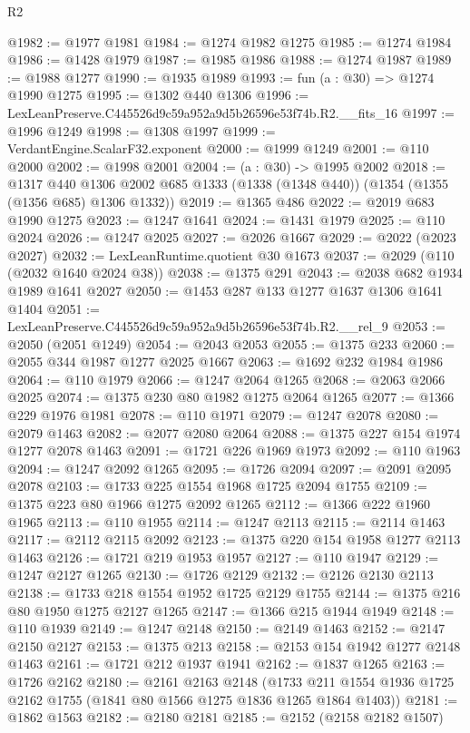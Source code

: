 \begin{lexlean}{R2}
\begin{coremodule}
@1982 := @1977 @1981
@1984 := @1274 @1982 @1275
@1985 := @1274 @1984
@1986 := @1428 @1979
@1987 := @1985 @1986
@1988 := @1274 @1987
@1989 := @1988 @1277
@1990 := @1935 @1989
@1993 := fun (a : @30) => @1274 @1990 @1275
@1995 := @1302 @440 @1306
@1996 := LexLeanPreserve.C445526d9c59a952a9d5b26596e53f74b.R2.__fits_16
@1997 := @1996 @1249
@1998 := @1308 @1997
@1999 := VerdantEngine.ScalarF32.exponent
@2000 := @1999 @1249
@2001 := @110 @2000
@2002 := @1998 @2001
@2004 := (a : @30) -> @1995 @2002
@2018 := @1317
    @440
    @1306
    @2002
    @685
    @1333
    (@1338 (@1348 @440))
    (@1354 (@1355 (@1356 @685) @1306 @1332))
@2019 := @1365 @486
@2022 := @2019 @683 @1990 @1275
@2023 := @1247 @1641
@2024 := @1431 @1979
@2025 := @110 @2024
@2026 := @1247 @2025
@2027 := @2026 @1667
@2029 := @2022 (@2023 @2027)
@2032 := LexLeanRuntime.quotient @30 @1673
@2037 := @2029 (@110 (@2032 @1640 @2024 @38))
@2038 := @1375 @291
@2043 := @2038 @682 @1934 @1989 @1641 @2027
@2050 := @1453 @287 @133 @1277 @1637 @1306 @1641 @1404
@2051 := LexLeanPreserve.C445526d9c59a952a9d5b26596e53f74b.R2.__rel_9
@2053 := @2050 (@2051 @1249)
@2054 := @2043 @2053
@2055 := @1375 @233
@2060 := @2055 @344 @1987 @1277 @2025 @1667
@2063 := @1692 @232 @1984 @1986
@2064 := @110 @1979
@2066 := @1247 @2064 @1265
@2068 := @2063 @2066 @2025
@2074 := @1375 @230 @80 @1982 @1275 @2064 @1265
@2077 := @1366 @229 @1976 @1981
@2078 := @110 @1971
@2079 := @1247 @2078
@2080 := @2079 @1463
@2082 := @2077 @2080 @2064
@2088 := @1375 @227 @154 @1974 @1277 @2078 @1463
@2091 := @1721 @226 @1969 @1973
@2092 := @110 @1963
@2094 := @1247 @2092 @1265
@2095 := @1726 @2094
@2097 := @2091 @2095 @2078
@2103 := @1733 @225 @1554 @1968 @1725 @2094 @1755
@2109 := @1375 @223 @80 @1966 @1275 @2092 @1265
@2112 := @1366 @222 @1960 @1965
@2113 := @110 @1955
@2114 := @1247 @2113
@2115 := @2114 @1463
@2117 := @2112 @2115 @2092
@2123 := @1375 @220 @154 @1958 @1277 @2113 @1463
@2126 := @1721 @219 @1953 @1957
@2127 := @110 @1947
@2129 := @1247 @2127 @1265
@2130 := @1726 @2129
@2132 := @2126 @2130 @2113
@2138 := @1733 @218 @1554 @1952 @1725 @2129 @1755
@2144 := @1375 @216 @80 @1950 @1275 @2127 @1265
@2147 := @1366 @215 @1944 @1949
@2148 := @110 @1939
@2149 := @1247 @2148
@2150 := @2149 @1463
@2152 := @2147 @2150 @2127
@2153 := @1375 @213
@2158 := @2153 @154 @1942 @1277 @2148 @1463
@2161 := @1721 @212 @1937 @1941
@2162 := @1837 @1265
@2163 := @1726 @2162
@2180 := @2161
    @2163
    @2148
    (@1733 @211 @1554 @1936 @1725 @2162 @1755 (@1841 @80 @1566 @1275 @1836 @1265 @1864 @1403))
@2181 := @1862 @1563
@2182 := @2180 @2181
@2185 := @2152 (@2158 @2182 @1507)

\end{coremodule}
\end{lexlean}

